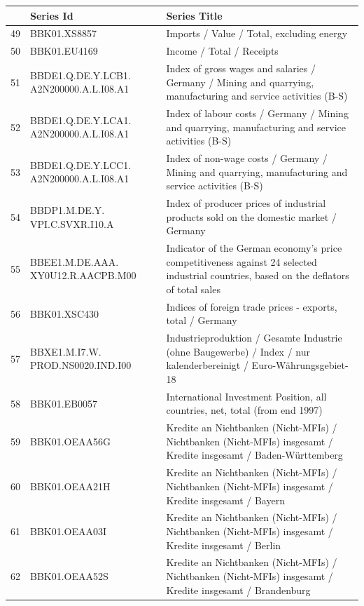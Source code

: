 \documentclass[11pt]{article}
\begin{document}
\begin{table}
\centering
\begin{tabular}{rp{5cm}p{11cm}}
& \textbf{Series Id} & \textbf{Series Title} \\
  \hline
  \hline
  49 & BBK01.XS8857 & Imports / Value / Total, excluding energy \\ 
  \hline
  50 & BBK01.EU4169 & Income / Total / Receipts \\ 
  \hline
  51 & BBDE1.Q.DE.Y.LCB1. A2N200000.A.L.I08.A1 & Index of gross wages and salaries / Germany / Mining and quarrying, manufacturing and service activities (B-S) \\ 
  \hline
  52 & BBDE1.Q.DE.Y.LCA1. A2N200000.A.L.I08.A1 & Index of labour costs / Germany / Mining and quarrying, manufacturing and service activities (B-S) \\ 
  \hline
  53 & BBDE1.Q.DE.Y.LCC1. A2N200000.A.L.I08.A1 & Index of non-wage costs / Germany / Mining and quarrying, manufacturing and service activities (B-S) \\ 
  \hline
  54 & BBDP1.M.DE.Y. VPI.C.SVXR.I10.A & Index of producer prices of industrial products sold on the domestic market / Germany \\ 
  \hline
  55 & BBEE1.M.DE.AAA. XY0U12.R.AACPB.M00 & Indicator of the German economy's price competitiveness against 24 selected industrial countries, based on the deflators of total sales \\ 
  \hline
  56 & BBK01.XSC430 & Indices of foreign trade prices - exports, total / Germany \\ 
  \hline
  57 & BBXE1.M.I7.W. PROD.NS0020.IND.I00 & Industrieproduktion / Gesamte Industrie (ohne Baugewerbe) / Index / nur kalenderbereinigt / Euro-Währungsgebiet-18 \\ 
  \hline
  58 & BBK01.EB0057 & International Investment Position, all countries, net, total (from end 1997) \\ 
  \hline
  59 & BBK01.OEAA56G & Kredite an Nichtbanken (Nicht-MFIs) / Nichtbanken (Nicht-MFIs) insgesamt / Kredite insgesamt / Baden-Württemberg \\ 
  \hline
  60 & BBK01.OEAA21H & Kredite an Nichtbanken (Nicht-MFIs) / Nichtbanken (Nicht-MFIs) insgesamt / Kredite insgesamt / Bayern \\ 
  \hline
  61 & BBK01.OEAA03I & Kredite an Nichtbanken (Nicht-MFIs) / Nichtbanken (Nicht-MFIs) insgesamt / Kredite insgesamt / Berlin \\ 
  \hline
  62 & BBK01.OEAA52S & Kredite an Nichtbanken (Nicht-MFIs) / Nichtbanken (Nicht-MFIs) insgesamt / Kredite insgesamt / Brandenburg \\ 

\end{tabular}
\end{table}
\end{document}
